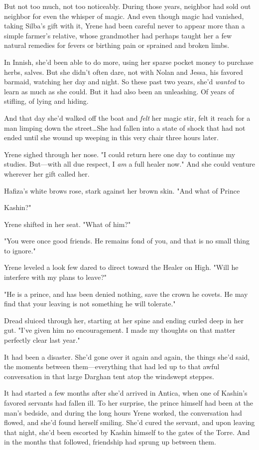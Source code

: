 But not too much, not too noticeably. During those years, neighbor had sold out neighbor for even the whisper of magic. And even though magic had vanished, taking Silba's gift with it, Yrene had been careful never to appear more than a simple farmer's relative, whose grandmother had perhaps taught her a few natural remedies for fevers or birthing pain or sprained and broken limbs.

In Innish, she'd been able to do more, using her sparse pocket money to purchase herbs, salves. But she didn't often dare, not with Nolan and Jessa, his favored barmaid, watching her day and night. So these past two years, she'd \emph{wanted} to learn as much as she could. But it had also been an unleashing. Of years of stifling, of lying and hiding.

And that day she'd walked off the boat and \emph{felt} her magic stir, felt it reach for a man limping down the street\ldots She had fallen into a state of shock that had not ended until she wound up weeping in this very chair three hours later.

Yrene sighed through her nose. "I could return here one day to continue my studies. But---with all due respect, I \emph{am} a full healer now." And she could venture wherever her gift called her.

Hafiza's white brows rose, stark against her brown skin. "And what of Prince

Kashin?"

Yrene shifted in her seat. "What of him?"

"You were once good friends. He remains fond of you, and that is no small thing to ignore."

Yrene leveled a look few dared to direct toward the Healer on High. "Will he interfere with my plans to leave?"

"He is a prince, and has been denied nothing, save the crown he covets. He may find that your leaving is not something he will tolerate."

Dread sluiced through her, starting at her spine and ending curled deep in her gut. "I've given him no encouragement. I made my thoughts on that matter perfectly clear last year."

It had been a disaster. She'd gone over it again and again, the things she'd said, the moments between them---everything that had led up to that awful conversation in that large Darghan tent atop the windswept steppes.

It had started a few months after she'd arrived in Antica, when one of Kashin's favored servants had fallen ill. To her surprise, the prince himself had been at the man's bedside, and during the long hours Yrene worked, the conversation had flowed, and she'd found herself smiling. She'd cured the servant, and upon leaving that night, she'd been escorted by Kashin himself to the gates of the Torre. And in the months that followed, friendship had sprung up between them.

